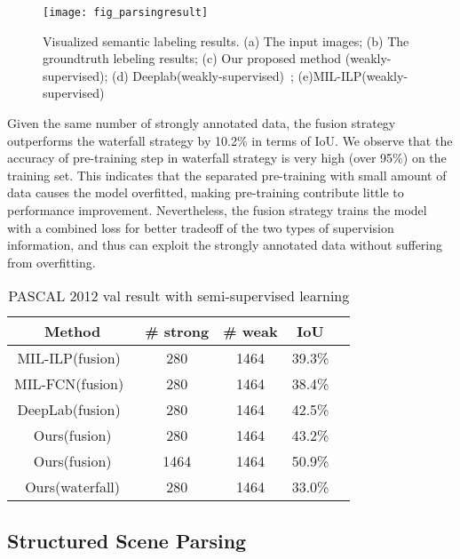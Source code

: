 \documentclass[10pt,twocolumn,letterpaper]{article}
\begin{document}
\begin{figure}[tbp]
\centering
\texttt{[image: fig\_parsingresult]}
\caption{Visualized semantic labeling results. (a) The input images; (b) The groundtruth lebeling results; (c) Our proposed method (weakly-supervised); (d) Deeplab(weakly-supervised)~\cite{DBLP:WeaklySegmentation}; (e)MIL-ILP(weakly-supervised)~\cite{pinheiro2015image}}
\label{fig:labeling_result}
\end{figure}

Given the same number of strongly annotated data, the fusion strategy outperforms the waterfall strategy by 10.2\% in terms of IoU. We observe that the accuracy of pre-training step in waterfall strategy is very high (over 95\%) on the training set. This indicates that the separated pre-training with small amount of data causes the model overfitted, making pre-training contribute little to performance improvement. Nevertheless, the fusion strategy trains the model with a combined loss for better tradeoff of the two types of supervision information, and thus can exploit the strongly annotated data without suffering from overfitting.

\begin{table}[!h]\small
\begin{center}
\begin{tabular}{|c|c|c|c|c|}

\hline
Method & \# strong & \# weak & IoU \\
\hline
MIL-ILP(fusion)~\cite{pinheiro2015image} & 280 & 1464 & 39.3\% \\
\hline
MIL-FCN(fusion)~\cite{DBLP:FCnetwork} & 280 & 1464 & 38.4\%\\
\hline
DeepLab(fusion)~\cite{DBLP:WeaklySegmentation} & 280 & 1464 & 42.5\% \\
\hline
Ours(fusion) & 280 & 1464 & 43.2\% \\
\hline
Ours(fusion) & 1464 & 1464 & 50.9\% \\
\hline
Ours(waterfall) & 280 & 1464 & 33.0\% \\
\hline

\end{tabular}
\end{center}
\caption{PASCAL 2012 val result with semi-supervised learning}
\label{tbl:semi_supervision}
\vspace{-3mm}
\end{table}


\subsection{Structured Scene Parsing}
\label{sub:structure_semantic_parsing}
\end{document}
